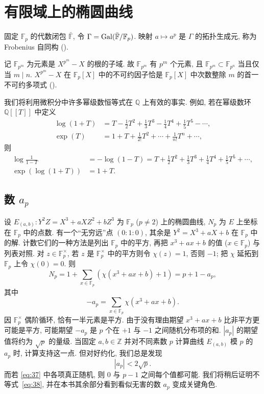 \section{有限域上的椭圆曲线}\label{sec:4.9}

固定 $\mathbb{F}_p$ 的代数闭包 $\bar{\mathbb{F}}$, 令 $\Gamma = \operatorname{Gal}(\bar{\mathbb{F}}/\mathbb{F}_p)$. 映射 $a\mapsto a^p$ 是 $\Gamma$ 的拓扑生成元, 称为 Frobenius 自同构 (\cite[7.16]{milne-ft}).

记 $\mathbb{F}_{p^m}$ 为元素是 $X^{p^m} - X$ 的根的子域. 故 $\mathbb{F}_{p^m}$ 有 $p^m$ 个元素, 且 $\mathbb{F}_{p^m}\subset\mathbb{F}_{p^n}$ 当且仅当 $m\mid n$. $X^{p^m} - X$ 在 $\mathbb{F}_p[X]$ 中的不可约因子恰是 $\mathbb{F}_p[X]$ 中次数整除 $m$ 的首一不可约多项式 (\cite[4.22, \ref{thm:1.4.23}]{milne-ft}).

我们将利用微积分中许多幂级数恒等式在 $\mathbb{Q}$ 上有效的事实. 例如, 若在幂级数环 $\mathbb{Q}[[T]]$ 中定义
\begin{align*}
    \log(1+T) & = T - \frac{1}{2}T^2 + \frac{1}{3}T^3 - \frac{1}{4}T^4 + \frac{1}{5}T^5 - \cdots,\\
    \exp(T) & = 1 + T + \frac{1}{2!}T^2 + \cdots + \frac{1}{n!}T^n + \cdots,
\end{align*}
则
\begin{align*}
    \log\frac{1}{1-T} & = -\log(1-T) = T + \frac{1}{2}T^2 + \frac{1}{3}T^3 + \frac{1}{4}T^4 + \frac{1}{5}T^5 + \cdots,\\
    \exp(\log(1+T)) & = 1 + T.
\end{align*}

\subsection*{数 $a_p$}

设 $E_{(a,b)}\colon Y^2Z = X^3 + aXZ^2 + bZ^3$ 为 $\mathbb{F}_p$ ($p\neq 2$) 上的椭圆曲线, $N_p$ 为 $E$ 上坐标在 $\mathbb{F}_p$ 中的点数. 有一个``无穷远''点 $(0:1:0)$, 其余是 $Y^2 = X^3 + aX + b$ 在 $\mathbb{F}_p$ 中的解. 计数它们的一种方法是列出 $\mathbb{F}_p$ 中的平方, 再把 $x^3 + ax + b$ 的值 ($x\in\mathbb{F}_p$) 与列表对照. 对 $z\in\mathbb{F}_p^{\times}$, 若 $z$ 是 $\mathbb{F}_p^{\times}$ 中的平方则令 $\chi(z) = 1$, 否则 $-1$; 把 $\chi$ 延拓到 $\mathbb{F}_p$ 上令 $\chi(0) = 0$. 则
\[
N_p = 1 + \sum_{x\in\mathbb{F}_p}(\chi(x^3 + ax + b) + 1) = p + 1 - a_p,
\]
其中
\begin{equation} \label{eq:37}
-a_p = \sum_{x\in\mathbb{F}_p}\chi(x^3 + ax + b).
\tag{37}
\end{equation}
因 $\mathbb{F}_p^{\times}$ 偶阶循环, 恰有一半元素是平方. 由于没有理由期望 $x^3 + ax + b$ 比非平方更可能是平方, 可能期望 $-a_p$ 是 $p$ 个在 $+1$ 与 $-1$ 之间随机分布项的和. $|a_p|$ 的期望值将约为 $\sqrt{p}$ 的量级. 当固定 $a, b\in\mathbb{Z}$ 并对不同素数 $p$ 计算曲线 $E_{(a,b)}$ 模 $p$ 的 $a_p$ 时, 计算支持这一点. 但对好约化, 我们总是发现
\begin{equation} \label{eq:38}
|a_p| < 2\sqrt{p}.
\tag{38}
\end{equation}
而若 \eqref{eq:37} 中各项真正随机, 则 $0$ 与 $p-1$ 之间每个值都可能. 我们将稍后证明不等式~\eqref{eq:38}, 并在本书其余部分看到看似无害的数 $a_p$ 变成关键角色.

